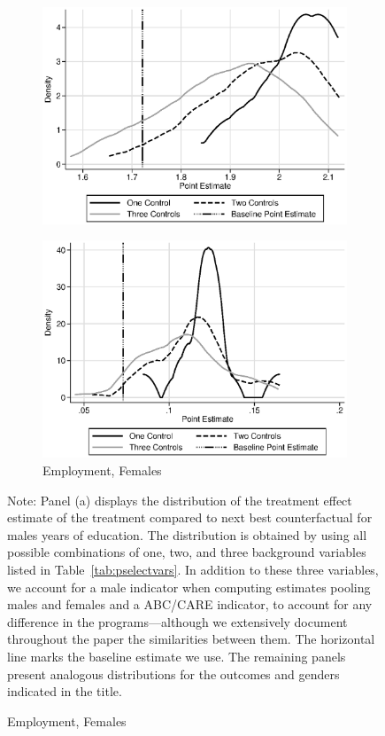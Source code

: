 \begin{figure}
\begin{subfigure}[h]{0.4\textwidth}
		\includegraphics[width=\textwidth]{output/sencontrols_female_years_30y_itt_wctrl.eps}
\end{subfigure}%
\begin{subfigure}[h]{0.4\textwidth}
	\centering
	\caption{Employment, Females}
		\includegraphics[width=\textwidth]{output/sencontrols_female_si30y_works_itt_wctrl.eps}
\end{subfigure}
\footnotesize \justify
Note: Panel (a) displays the distribution of the treatment effect estimate of the treatment compared to next best counterfactual for males years of education. The distribution is obtained by using all possible combinations of one, two, and three background variables listed in Table~\ref{tab:pselectvars}. In addition to these three variables, we account for a male indicator when computing estimates pooling males and females and a ABC/CARE indicator, to account for any difference in the programs---although we extensively document throughout the paper the similarities between them. The horizontal line marks the baseline estimate we use. The remaining panels present analogous distributions for the outcomes and genders indicated in the title.\\
\end{figure}






